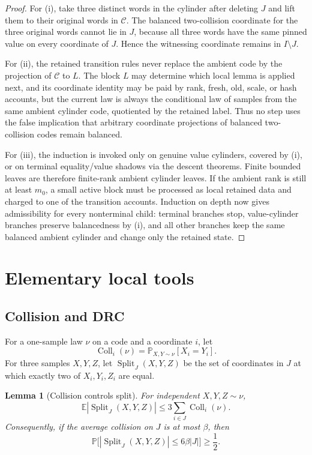 \documentclass[11pt]{article}
\newtheorem{lemma}[theorem]{Lemma}
\theoremstyle{remark}
\newcommand{\C}{\mathcal C}
\newcommand{\E}{\mathbb E}
\newcommand{\Prob}{\mathbb P}
\newcommand{\Split}{\operatorname{Split}}
\newcommand{\Coll}{\operatorname{Coll}}
\begin{document}
\begin{proof}
For (i), take three distinct words in the cylinder after deleting $J$ and lift them to their original words in $\C$.  The balanced two-collision coordinate for the three original words cannot lie in $J$, because all three words have the same pinned value on every coordinate of $J$.  Hence the witnessing coordinate remains in $I\setminus J$.

For (ii), the retained transition rules never replace the ambient code by the projection of $\C$ to $L$.  The block $L$ may determine which local lemma is applied next, and its coordinate identity may be paid by rank, fresh, old, scale, or hash accounts, but the current law is always the conditional law of samples from the same ambient cylinder code, quotiented by the retained label.  Thus no step uses the false implication that arbitrary coordinate projections of balanced two-collision codes remain balanced.

For (iii), the induction is invoked only on genuine value cylinders, covered by (i), or on terminal equality/value shadows via the descent theorems.  Finite bounded leaves are therefore finite-rank ambient cylinder leaves.  If the ambient rank is still at least $m_0$, a small active block must be processed as local retained data and charged to one of the transition accounts.  Induction on depth now gives admissibility for every nonterminal child: terminal branches stop, value-cylinder branches preserve balancedness by (i), and all other branches keep the same balanced ambient cylinder and change only the retained state.
\end{proof}

\section{Elementary local tools}

\subsection{Collision and DRC}

For a one-sample law $\nu$ on a code and a coordinate $i$, let
\[
        \Coll_i(\nu)=\Prob_{X,Y\sim\nu}[X_i=Y_i].
\]
For three samples $X,Y,Z$, let $\Split_J(X,Y,Z)$ be the set of coordinates in $J$ at which exactly two of $X_i,Y_i,Z_i$ are equal.

\begin{lemma}[Collision controls split]\label{lem:collision-split}
For independent $X,Y,Z\sim\nu$,
\[
        \E |\Split_J(X,Y,Z)|\le 3\sum_{i\in J}\Coll_i(\nu).
\]
Consequently, if the average collision on $J$ is at most $\beta$, then
\[
        \Prob\bigl[|\Split_J(X,Y,Z)|\le 6\beta |J|\bigr]\ge \frac{1}{2}.
\]
\end{lemma}
\end{document}

